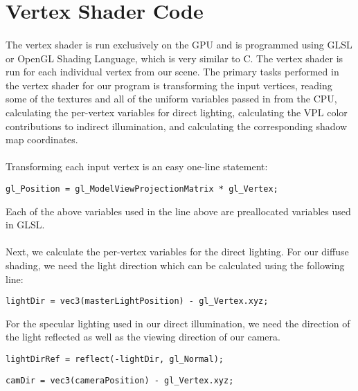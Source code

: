 \section{Vertex Shader Code}
\paragraph{}
The vertex shader is run exclusively on the GPU and is programmed using GLSL or OpenGL Shading Language, which is very similar to C.  The vertex shader is run for each individual vertex from our scene.  The primary tasks performed in the vertex shader for our program is transforming the input vertices, reading some of the textures and all of the uniform variables passed in from the CPU, calculating the per-vertex variables for direct lighting, calculating the VPL color contributions to indirect illumination, and calculating the corresponding shadow map coordinates.

\paragraph{}
Transforming each input vertex is an easy one-line statement:

\begin{lstlisting}
gl_Position = gl_ModelViewProjectionMatrix * gl_Vertex;
\end{lstlisting}

Each of the above variables used in the line above are preallocated variables used in GLSL.

\paragraph{}
Next, we calculate the per-vertex variables for the direct lighting.  For our diffuse shading, we need the light direction which can be calculated using the following line:

\begin{lstlisting}
lightDir = vec3(masterLightPosition) - gl_Vertex.xyz;
\end{lstlisting}

For the specular lighting used in our direct illumination, we need the direction of the light reflected as well as the viewing direction of our camera.

\begin{lstlisting}
lightDirRef = reflect(-lightDir, gl_Normal);
\end{lstlisting}

\begin{lstlisting}
camDir = vec3(cameraPosition) - gl_Vertex.xyz;
\end{lstlisting}

